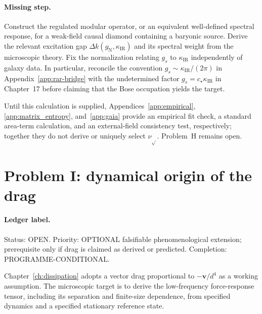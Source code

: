 \paragraph{Missing step.}
Construct the regulated modular operator, or an equivalent
well-defined spectral response, for a weak-field causal diamond
containing a baryonic source. Derive the relevant excitation gap
\(\Delta k(g_{\mathrm N},\kappa_{\mathrm{IR}})\) and its spectral
weight from the microscopic theory. Fix the normalization relating
\(g_s\) to \(\kappa_{\mathrm{IR}}\) independently of galaxy data.
In particular, reconcile the convention
\(g_s\sim\kappa_{\mathrm{IR}}/(2\pi)\) in
Appendix~\ref{app:rar-bridge} with the undetermined factor
\(g_s=c_\star\kappa_{\mathrm{IR}}\) in Chapter~17 before claiming
that the Bose occupation yields the target.

Until this calculation is supplied, Appendices~\ref{app:empirical},
\ref{app:matrix_entropy}, and~\ref{app:gaia} provide an empirical fit
check, a standard area-term calculation, and an external-field
consistency test, respectively; together they do not derive or
uniquely select \(\nu_{\sqrt{}}\). Problem~H remains open.

\section{Problem I: dynamical origin of the drag}
\label{sec:status-I}

\paragraph{Ledger label.}
Status: OPEN. Priority: OPTIONAL falsifiable phenomenological
extension; prerequisite only if drag is claimed as derived or predicted.
Completion: PROGRAMME-CONDITIONAL.

Chapter~\ref{ch:dissipation} adopts a vector drag proportional to
\(-\mathbf v/d^4\) as a working assumption. The microscopic target
is to derive the low-frequency force-response tensor, including its
separation and finite-size dependence, from specified dynamics and
a specified stationary reference state.

